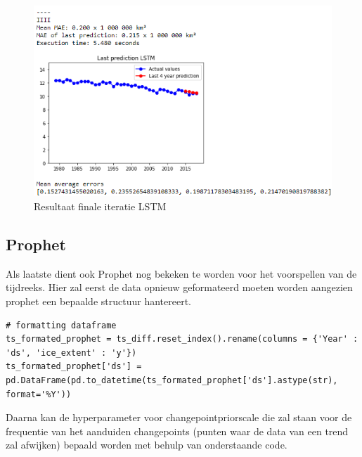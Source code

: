 \begin{figure}
    \centering
    \caption{Resultaat finale iteratie LSTM}
    \label{fig:uvnslstm}
    \includegraphics[width=0.7\linewidth]{uv_ns_LSTM}
\end{figure}

\clearpage
\subsection{Prophet}

Als laatste dient ook Prophet nog bekeken te worden voor het voorspellen van de tijdreeks. Hier zal eerst de data opnieuw geformateerd moeten worden aangezien prophet een bepaalde structuur hantereert.

\begin{verbatim}
# formatting dataframe
ts_formated_prophet = ts_diff.reset_index().rename(columns = {'Year' : 'ds', 'ice_extent' : 'y'})
ts_formated_prophet['ds'] = pd.DataFrame(pd.to_datetime(ts_formated_prophet['ds'].astype(str), format='%Y'))
\end{verbatim}

Daarna kan de hyperparameter voor changepoint\textunderscore prior\textunderscore scale die zal staan voor de frequentie van het aanduiden changepoints (punten waar de data van een trend zal afwijken) bepaald worden met behulp van onderstaande code.

